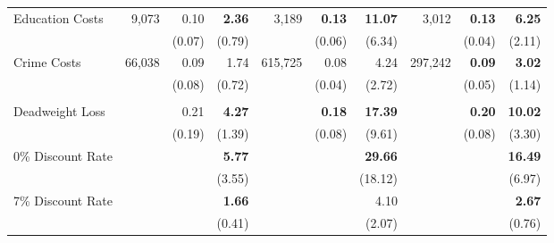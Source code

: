 \begin{tabular}{l r r r r r r r r r}
Education Costs	&	9,073	&	0.10	&	\textbf{2.36}	&	3,189	&	\textbf{0.13}	&	\textbf{11.07}	&	3,012	&	\textbf{0.13}	&	\textbf{6.25}	\\
	&		&	(0.07)	&	(0.79)	&	&	(0.06)	&	(6.34)	&		&	(0.04)	&	(2.11)	\\
Crime Costs	&	66,038	&	0.09	&	1.74	&	615,725	&	0.08	&	4.24	&	297,242	&	\textbf{0.09}	&	\textbf{3.02}	\\
	&		&	(0.08)	&	(0.72)	&		&	(0.04)	&	(2.72)	&	&	(0.05)	&	(1.14)	\\ \\
Deadweight Loss	&		&	0.21	&	\textbf{4.27}	&		&	\textbf{0.18}	&	\textbf{17.39}	&		&	\textbf{0.20}	&	\textbf{10.02}	\\
	&		&	(0.19)	&	(1.39)	&		&	(0.08)	&	(9.61)	&		&	(0.08)	&	(3.30)	\\
0\% Discount Rate	&		&		&	\textbf{5.77}	&		&		&	\textbf{29.66}	&		&		&	\textbf{16.49}	\\
	&		&		&	(3.55)	&		&		&	(18.12)	&		&		&	(6.97)	\\
7\% Discount Rate	&		&		&	\textbf{1.66}	&		&		&	4.10	&		&		&	\textbf{2.67}	\\
	&		&		&	(0.41)	&		&		&	(2.07)	&		&		&	(0.76)	\\

\bottomrule																			
\end{tabular}																			

